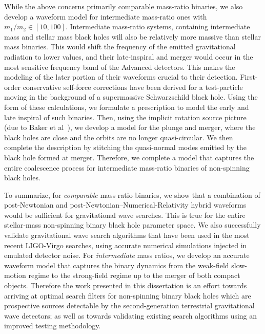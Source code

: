 While the above concerns primarily comparable mass-ratio binaries, we 
also develop a waveform model for intermediate mass-ratio ones with 
$m_1/m_2 \in [10, 100]$. 
Intermediate mass-ratio systems, containing intermediate mass  
and stellar mass black holes will also be relatively more massive than stellar
mass binaries.
This would shift the frequency of the emitted gravitational radiation to 
lower values, and their late-inspiral and merger would occur in the most
sensitive frequency band of the Advanced detectors. This makes the modeling 
of the later portion of their waveforms crucial to their detection. 
%
First-order conservative self-force corrections have been derived for a
test-particle moving in the background of a supermassive Schwarzschild 
black hole. Using the form of these calculations, we formulate a 
prescription to model the early and late inspiral
of such binaries. Then, using the implicit rotation source picture
(due to Baker et al~\cite{Baker:2008}), we develop a model for the plunge and merger,
where the black holes are close and the orbits are no longer quasi-circular.
We then complete the description by stitching the quasi-normal modes emitted
by the black hole formed at merger. 
Therefore, we complete a model that captures the entire coalescence process
for intermediate mass-ratio binaries of non-spinning black holes.

To summarize, for {\it comparable} mass ratio binaries, we show that a combination
of post-Newtonian and post-Newtonian--Numerical-Relativity hybrid waveforms
would be sufficient for gravitational wave searches. This is true for the 
entire stellar-mass non-spinning binary black hole parameter space.
We also successfully validate gravitational wave search algorithms 
that have been used in the most recent LIGO-Virgo searches, using accurate 
numerical simulations injected in emulated detector noise. 
For {\it intermediate} mass ratios, we develop an accurate waveform 
model that captures the binary dynamics from the weak-field slow-motion
regime to the strong-field regime up to the merger of both compact objects. 
Therefore the work presented in this dissertation is an effort towards
arriving at optimal search filters for non-spinning binary black holes 
which are prospective sources detectable by the second-generation terrestrial
gravitational wave detectors; as well as towards validating existing search 
algorithms using an improved testing methodology.












